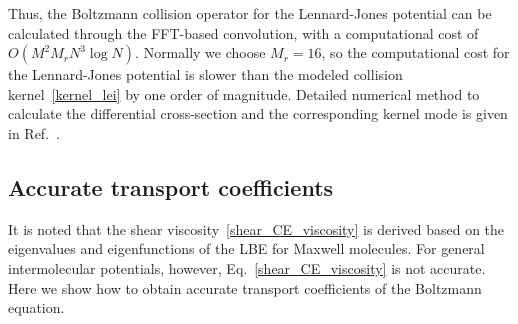 %


Thus, the Boltzmann collision operator for the Lennard-Jones potential can be calculated through the FFT-based convolution, with a computational cost of $O(M^2M_rN^3\log{N})$. Normally we choose $M_r=16$, so the computational cost for the Lennard-Jones potential is slower than the modeled collision kernel~\eqref{kernel_lei} by one order of magnitude. Detailed numerical method to calculate the differential cross-section and the corresponding kernel mode is given in Ref.~\cite{wuPoF2015}. 










\subsection{Accurate transport coefficients}\label{accurate_transport}


It is noted that the shear viscosity~\eqref{shear_CE_viscosity} is derived based on the eigenvalues and eigenfunctions of the LBE for Maxwell molecules. For general intermolecular potentials, however, Eq.~\eqref{shear_CE_viscosity} is not accurate. Here we show how to obtain accurate transport coefficients of the Boltzmann equation. 


